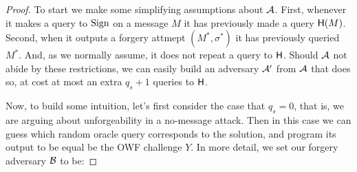 \begin{proof}
To start we make some simplifying assumptions about ${\mathcal A}$. First, whenever it
makes a query to $\textnormal{Sign}$ on a message $M$ it has previously made a query
$\mathsf{H}(M)$. Second, when it outputs a forgery attmept $(M^*,\sigma^*)$ it has
previously queried $M^*$. And, as we normally assume, it does not repeat a query
to $\mathsf{H}$.  Should ${\mathcal A}$ not abide by these restrictions, we can easily
build an adversary ${\mathcal A}'$ from ${\mathcal A}$ that does so, at cost at most an extra
$q_s + 1$ queries to $\mathsf{H}$.

Now, to build some intuition, let's first consider the case that $q_s = 0$, that is, 
we are arguing about unforgeability in a no-message attack. 
Then in this case we can 
guess which random oracle query corresponds to the solution, and program its
output to be equal be the OWF challenge $Y$.  In more detail, we set our forgery
adversary ${\mathcal B}$ to be:


\end{proof}
